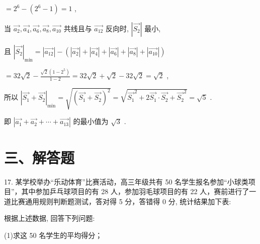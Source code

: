 \documentclass[10pt]{article}
\begin{document}
\(= {2}^{6} - \left( {{2}^{6} - 1}\right)  = 1\) ,

当 \(\overrightarrow{{a}_{2}},\overrightarrow{{a}_{4}},\overrightarrow{{a}_{6}},\overrightarrow{{a}_{8}},\overrightarrow{{a}_{10}}\) 共线且与 \(\overrightarrow{{a}_{12}}\) 反向时, \(\left| \overrightarrow{{S}_{2}}\right|\) 最小,

且 \({\left| \overrightarrow{{S}_{2}}\right| }_{\min } = \left| \overrightarrow{{a}_{12}}\right|  - \left( {\left| \overrightarrow{{a}_{2}}\right|  + \left| \overrightarrow{{a}_{4}}\right|  + \left| \overrightarrow{{a}_{6}}\right|  + \left| \overrightarrow{{a}_{8}}\right|  + \left| \overrightarrow{{a}_{10}}\right| }\right)\)

\(= {32}\sqrt{2} - \frac{\sqrt{2}\left( {1 - {2}^{5}}\right) }{1 - 2} = {32}\sqrt{2} + \sqrt{2} - {32}\sqrt{2} = \sqrt{2}\) ,

所以 \({\left| \overrightarrow{{S}_{1}} + \overrightarrow{{S}_{2}}\right| }_{\min } = \sqrt{{\left( \overrightarrow{{S}_{1}} + \overrightarrow{{S}_{2}}\right) }^{2}} = \sqrt{{\overrightarrow{{S}_{1}}}^{2} + 2\overrightarrow{{S}_{1}} \cdot  \overrightarrow{{S}_{2}} + {\overrightarrow{{S}_{2}}}^{2}} = \sqrt{5}\) .

即 \(\left| {\overrightarrow{{a}_{1}} + \overrightarrow{{a}_{2}} + \cdots  + \overrightarrow{{a}_{13}}}\right|\) 的最小值为 \(\sqrt{3}\) .

\section*{三、解答题}

17. 某学校举办“乐动体育”比赛活动，高三年级共有 50 名学生报名参加“小球类项目”，其中参加乒乓球项目的有 28 人，参加羽毛球项目的有 22 人，赛前进行了一道比赛通用规则判断题测试，答对得 5 分，答错得 0 分, 统计结果加下表:

\begin{center}
\end{center}

根据上述数据, 回答下列问题:

(1)求这 50 名学生的平均得分；
\end{document}
